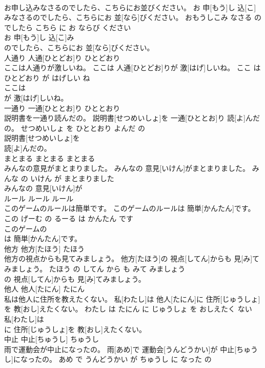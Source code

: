 \documentclass[8pt]{extreport}
\begin{document}
\begin{CJK}{UTF8}{min}
\\	お申し込みなさるのでしたら、こちらにお並びください。	お 申[もう]し 込[こ]みなさるのでしたら、こちらにお 並[なら]びください。	おもうしこみ なさる の でしたら こちら に お ならび ください	
\\	お 申[もう]し 込[こ]み
\\	のでしたら、こちらにお 並[なら]びください。			
\\	人通り	人通[ひとどお]り	ひとどおり	
\\	ここは人通りが激しいね。	ここは 人通[ひとどお]りが 激[はげ]しいね。	ここ は ひとどおり が はげしい ね	
\\	ここは
\\	が 激[はげ]しいね。			
\\	一通り	一通[ひととお]り	ひととおり	
\\	説明書を一通り読んだの。	説明書[せつめいしょ]を 一通[ひととお]り 読[よ]んだの。	せつめいしょ を ひととおり よんだ の	
\\	説明書[せつめいしょ]を
\\	読[よ]んだの。			
\\	まとまる	まとまる	まとまる	
\\	みんなの意見がまとまりました。	みんなの 意見[いけん]がまとまりました。	みんな の いけん が まとまりました	
\\	みんなの 意見[いけん]が
\\	ルール	ルール	ルール	
\\	このゲームのルールは簡単です。	このゲームのルールは 簡単[かんたん]です。	この げーむ の るーる は かんたん です	
\\	このゲームの
\\	は 簡単[かんたん]です。			
\\	他方	他方[たほう]	たほう	
\\	他方の視点からも見てみましょう。	他方[たほう]の 視点[してん]からも 見[み]てみましょう。	たほう の してん から も みて みましょう	
\\	の 視点[してん]からも 見[み]てみましょう。			
\\	他人	他人[たにん]	たにん	
\\	私は他人に住所を教えたくない。	私[わたし]は 他人[たにん]に 住所[じゅうしょ]を 教[おし]えたくない。	わたし は たにん に じゅうしょ を おしえたく ない	
\\	私[わたし]は
\\	に 住所[じゅうしょ]を 教[おし]えたくない。			
\\	中止	中止[ちゅうし]	ちゅうし	
\\	雨で運動会が中止になったの。	雨[あめ]で 運動会[うんどうかい]が 中止[ちゅうし]になったの。	あめ で うんどうかい が ちゅうし に なった の	

\end{CJK}
\end{document}
